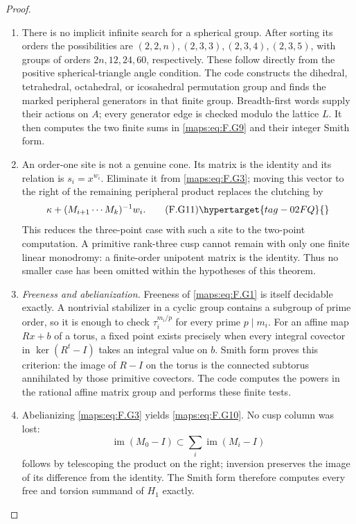 \begin{proof}
\begin{enumerate}[label={$\langle1\rangle$\arabic*.}]
\item There is no implicit infinite search for a spherical group.
After sorting its orders the possibilities are
$(2,2,n),(2,3,3),(2,3,4),(2,3,5)$, with groups of orders
$2n,12,24,60$, respectively.  These follow directly from
the positive spherical-triangle angle condition.
The code constructs the dihedral, tetrahedral, octahedral,
or icosahedral permutation group and finds the marked
peripheral generators in that finite group.  Breadth-first
words supply their actions on $A$; every generator edge is
checked modulo the lattice $L$.  It then computes
the two finite sums in \eqref{maps:eq:F.G9} and their integer Smith form.

\item An order-one site is not a genuine cone.  Its matrix is the
identity and its relation is $s_i=x^{w_i}$.  Eliminate it
from \eqref{maps:eq:F.G3}; moving this vector to the right of the remaining
peripheral product replaces the clutching by
\[
       \kappa+(M_{i+1}\cdots M_k)^{-1}w_i.                 \tag{F.G11}\hypertarget{tag-02FQ}{}\label{maps:eq:F.G11}
\]
This reduces the three-point case with such a site to the
two-point computation.  A primitive rank-three cusp cannot
remain with only one finite linear monodromy: a finite-order
unipotent matrix is the identity.  Thus no smaller case has
been omitted within the hypotheses of this theorem.

\item \emph{Freeness and abelianization.}
Freeness of \eqref{maps:eq:F.G1} is itself decidable exactly.  A nontrivial
stabilizer in a cyclic group contains a subgroup of prime
order, so it is enough to check $\tau_i^{m_i/p}$ for every
prime $p\mid m_i$.  For an affine map $Rx+b$ of a torus,
a fixed point exists precisely when every integral covector
in $\ker(R^t-I)$ takes an integral value on $b$.
Smith form proves this criterion: the image of $R-I$ on
the torus is the connected subtorus annihilated by those
primitive covectors.  The code computes the powers in the
rational affine matrix group and performs these finite tests.

\item Abelianizing \eqref{maps:eq:F.G3} yields \eqref{maps:eq:F.G10}.  No cusp column was lost:
\[
 \operatorname{im}(M_0-I)
       \subset\sum_i\operatorname{im}(M_i-I)
\]
follows by telescoping the product on the right; inversion
preserves the image of its difference from the identity.
The Smith form therefore computes every free and torsion
summand of $H_1$ exactly.


\end{enumerate}
\end{proof}
